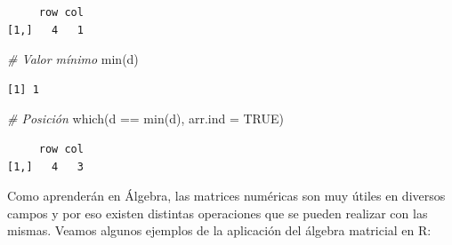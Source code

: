\documentclass[
]{book}
\newenvironment{Shaded}{\begin{snugshade}}{\end{snugshade}}
\newcommand{\AttributeTok}[1]{\textcolor[rgb]{0.77,0.63,0.00}{#1}}
\newcommand{\CommentTok}[1]{\textcolor[rgb]{0.56,0.35,0.01}{\textit{#1}}}
\newcommand{\ConstantTok}[1]{\textcolor[rgb]{0.00,0.00,0.00}{#1}}
\newcommand{\FunctionTok}[1]{\textcolor[rgb]{0.00,0.00,0.00}{#1}}
\newcommand{\NormalTok}[1]{#1}
\newcommand{\SpecialCharTok}[1]{\textcolor[rgb]{0.00,0.00,0.00}{#1}}
\begin{document}
\begin{itemize}
\begin{verbatim}
     row col
[1,]   4   1
\end{verbatim}

\begin{Shaded}
\begin{Highlighting}[]
\CommentTok{\# Valor mínimo}
\FunctionTok{min}\NormalTok{(d)}
\end{Highlighting}
\end{Shaded}

\begin{verbatim}
[1] 1
\end{verbatim}

\begin{Shaded}
\begin{Highlighting}[]
\CommentTok{\# Posición}
\FunctionTok{which}\NormalTok{(d }\SpecialCharTok{==} \FunctionTok{min}\NormalTok{(d), }\AttributeTok{arr.ind =} \ConstantTok{TRUE}\NormalTok{)}
\end{Highlighting}
\end{Shaded}

\begin{verbatim}
     row col
[1,]   4   3
\end{verbatim}
\end{itemize}

Como aprenderán en Álgebra, las matrices numéricas son muy útiles en diversos campos y por eso existen distintas operaciones que se pueden realizar con las mismas. Veamos algunos ejemplos de la aplicación del álgebra matricial en R:
\end{document}
